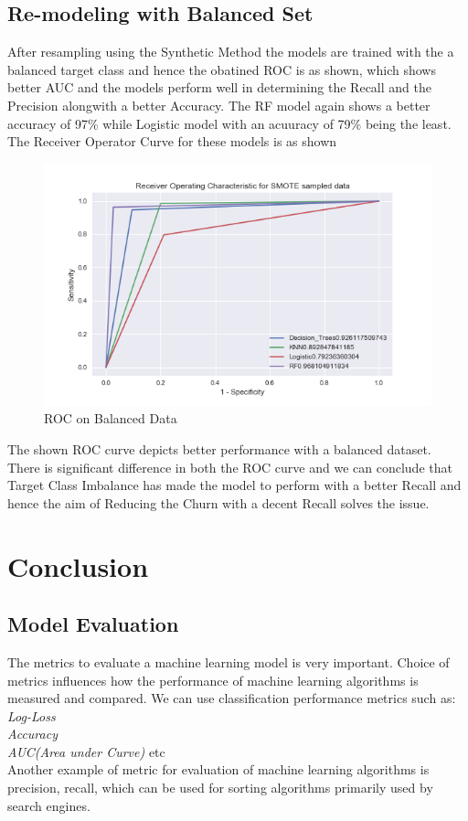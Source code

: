 \documentclass[a4paper,12pt]{report}
\begin{document}
\section{Re-modeling with Balanced Set}
After resampling using the Synthetic Method the models are trained with the a balanced target class and hence the obatined ROC is as shown, which shows better AUC and the models perform well in determining the Recall and the Precision alongwith a better Accuracy. The RF model again shows  a better accuracy of 97\% while Logistic model with an acuuracy of 79\% being the least. The Receiver Operator Curve for these models is as shown \\
\begin{figure}[!htbp]
\vspace{-100pt}
\centering
\includegraphics[width = \textwidth]{Balanced_ROC.PNG}
\caption{ROC on Balanced Data}
\label{fig:3.6}
\end{figure}
\FloatBarrier
The shown ROC curve depicts better performance with a balanced dataset. There is significant difference in both the ROC curve and we can conclude that Target Class Imbalance has made the model to perform with a better Recall and hence the aim of Reducing the Churn with a decent Recall solves the issue.


\chapter{Conclusion}
\section{Model Evaluation}
The metrics to evaluate a machine learning model is very important. Choice of metrics influences how the performance of machine learning algorithms is measured and compared. 
We can use classification performance metrics such as:\\
\textit{Log-Loss}\\
\textit{Accuracy}\\
\textit{AUC(Area under Curve)} etc\\
Another example of metric for evaluation of machine learning algorithms is precision, recall, which can be used for sorting algorithms primarily used by search engines.\\
\end{document}

